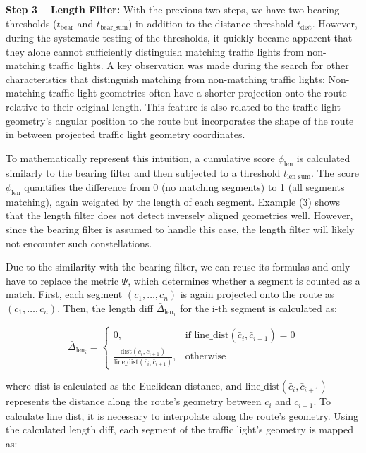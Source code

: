 \textbf{\color{cidarkblue}Step 3 -- Length Filter:} With the previous two steps, we have two bearing thresholds ($t_{\text{bear}}$ and $t_{\text{bear\_sum}}$) in addition to the distance threshold $t_{\text{dist}}$. However, during the systematic testing of the thresholds, it quickly became apparent that they alone cannot sufficiently distinguish matching traffic lights from non-matching traffic lights. A key observation was made during the search for other characteristics that distinguish matching from non-matching traffic lights: Non-matching traffic light geometries often have a shorter projection onto the route relative to their original length. This feature is also related to the traffic light geometry's angular position to the route but incorporates the shape of the route in between projected traffic light geometry coordinates.

To mathematically represent this intuition, a cumulative score $\phi_{\text{len}}$ is calculated similarly to the bearing filter and then subjected to a threshold $t_{\text{len\_sum}}$. The score $\phi_{\text{len}}$ quantifies the difference from 0 (no matching segments) to 1 (all segments matching), again weighted by the length of each segment. Example (3) shows that the length filter does not detect inversely aligned geometries well. However, since the bearing filter is assumed to handle this case, the length filter will likely not encounter such constellations.

Due to the similarity with the bearing filter, we can reuse its formulas and only have to replace the metric $\Psi$, which determines whether a segment is counted as a match. First, each segment $(c_1, \dots, c_n)$ is again projected onto the route as $(\bar{c_1}, \dots, \bar{c_n})$. Then, the length diff $\bar{\Delta}_{\text{len}_1}$ for the i-th segment is calculated as:

\begin{equation}
    \bar{\Delta}_{\text{len}_i} = 
        \begin{cases}
            0,& \text{if } \text{line\_dist}(\bar{c}_i, \bar{c}_{i+1}) = 0 \\
            \frac{\text{dist}(c_{i}, c_{i+1})}{\text{line\_dist}(\bar{c}_{i}, \bar{c}_{i+1})},              & \text{otherwise}
        \end{cases}
\end{equation}

where $\text{dist}$ is calculated as the Euclidean distance, and $\text{line\_dist}(\bar{c}_i, \bar{c}_{i+1})$ represents the distance along the route's geometry between $\bar{c}_i$ and $\bar{c}_{i+1}$. To calculate $\text{line\_dist}$, it is necessary to interpolate along the route's geometry. Using the calculated length diff, each segment of the traffic light's geometry is mapped as:


